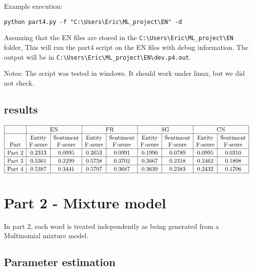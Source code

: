 \documentclass[12pt]{article}
\begin{document}
Example execution:
\begin{verbatim}
python part4.py -f "C:\Users\Eric\ML_project\EN" -d
\end{verbatim}
Assuming that the EN files are stored in the \verb|C:\Users\Eric\ML_project\EN| folder, This will run the part4 script on the EN files with debug information. The output will be in \verb|C:\Users\Eric\ML_project\EN\dev.p4.out|.

Notes: The script was tested in windows. It should work under linux, but we did not check.

\subsection{results}
\[
\begin{array}{|c|c|c|c|c|c|c|c|c|}
\hline \rule{0pt}{1em}
& \multicolumn{2}{c|}{\mbox{EN}}
& \multicolumn{2}{c|}{\mbox{FR}}
& \multicolumn{2}{c|}{\mbox{SG}}
& \multicolumn{2}{c|}{\mbox{CN}} \\
\hline \rule{0pt}{1em}
            & \mbox{Entity} & \mbox{Sentiment} 
            & \mbox{Entity} & \mbox{Sentiment}
            & \mbox{Entity} & \mbox{Sentiment}
            & \mbox{Entity} & \mbox{Sentiment} \\
\mbox{Part} & \mbox{F-score} & \mbox{F-score} 
            & \mbox{F-score} & \mbox{F-score}
            & \mbox{F-score} & \mbox{F-score}
            & \mbox{F-score} & \mbox{F-score} \\
\hline \rule{0pt}{1em}
\mbox{Part 2} & 0.2313 & 0.0995 & 0.2653 & 0.0991 & 0.1990 & 0.0789 & 0.0995 & 0.0310 \\
\hline \rule{0pt}{1em}
\mbox{Part 3} & 0.5361 & 0.3299 & 0.5758 & 0.3702 & 0.3667 & 0.2318 & 0.2462 & 0.1808 \\
\hline \rule{0pt}{1em}
\mbox{Part 4} & 0.5387 & 0.3441 & 0.5707 & 0.3687 & 0.3639 & 0.2383 & 0.2432 & 0.1706 \\
\hline
\end{array}
\]



\pagebreak

\section{Part 2 - Mixture model}

In part 2, each word is treated independently as being generated from a Multinomial mixture model.

\subsection{Parameter estimation}
\end{document}
